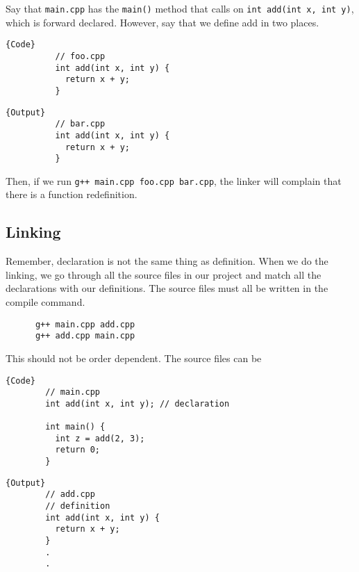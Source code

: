 \documentclass{article}
\begin{document}
    \begin{example}
      Say that \texttt{main.cpp} has the \texttt{main()} method that calls on \texttt{int add(int x, int y)}, which is forward declared. However, say that we define add in two places. 

      \noindent\begin{minipage}{.5\textwidth}
        \begin{lstlisting}[]{Code}
          // foo.cpp 
          int add(int x, int y) {
            return x + y; 
          }
        \end{lstlisting}
        \end{minipage}
        \hfill
        \begin{minipage}{.49\textwidth}
        \begin{lstlisting}[]{Output}
          // bar.cpp 
          int add(int x, int y) {
            return x + y; 
          }
        \end{lstlisting}
      \end{minipage}
      Then, if we run \texttt{g++ main.cpp foo.cpp bar.cpp}, the linker will complain that there is a function redefinition. 
    \end{example}

  \subsection{Linking} 

    Remember, declaration is not the same thing as definition. When we do the linking, we go through all the source files in our project and match all the declarations with our definitions. The source files must all be written in the compile command. 

    \begin{lstlisting}
      g++ main.cpp add.cpp
      g++ add.cpp main.cpp
    \end{lstlisting}

    This should not be order dependent. The source files can be 

    \noindent\begin{minipage}{.5\textwidth}
      \begin{lstlisting}[]{Code}
        // main.cpp 
        int add(int x, int y); // declaration

        int main() {  
          int z = add(2, 3); 
          return 0; 
        }
      \end{lstlisting}
      \end{minipage}
      \hfill
      \begin{minipage}{.49\textwidth}
      \begin{lstlisting}[]{Output}
        // add.cpp
        // definition
        int add(int x, int y) { 
          return x + y;
        }
        .
        .
      \end{lstlisting}
    \end{minipage}
\end{document}
